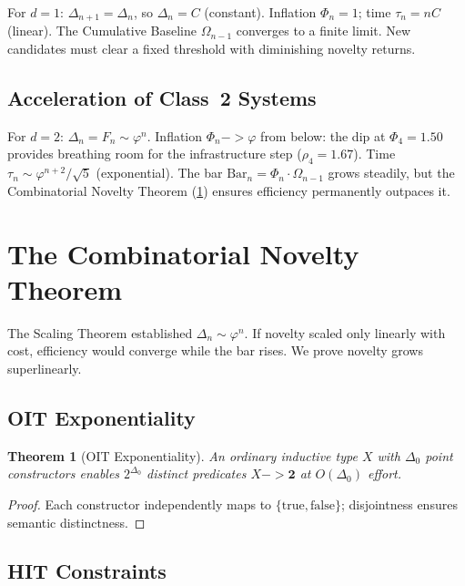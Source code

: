 \documentclass[11pt,a4paper]{article}
\def\to{->}%
\theoremstyle{plain}
\newtheorem{theorem}{Theorem}[section]
\theoremstyle{definition}
\theoremstyle{remark}
\begin{document}
For $d = 1$: $\Delta_{n+1} = \Delta_n$, so $\Delta_n = C$ (constant).
Inflation $\Phi_n = 1$; time $\tau_n = nC$ (linear).
The Cumulative Baseline $\Omega_{n-1}$ converges to a finite limit.
New candidates must clear a fixed threshold with diminishing novelty returns.

\subsection{Acceleration of Class~2 Systems}

For $d = 2$: $\Delta_n = F_n \sim \varphi^n$.
Inflation $\Phi_n \to \varphi$ from below: the dip at $\Phi_4 = 1.50$ provides breathing room for the infrastructure step ($\rho_4 = 1.67$).
Time $\tau_n \sim \varphi^{n+2}/\sqrt{5}$ (exponential).
The bar $\mathrm{Bar}_n = \Phi_n \cdot \Omega_{n-1}$ grows steadily, but the Combinatorial Novelty Theorem (\cref{sec:exponentiality}) ensures efficiency permanently outpaces it.

\section{The Combinatorial Novelty Theorem}
\label{sec:exponentiality}

The Scaling Theorem established $\Delta_n \sim \varphi^n$.
If novelty scaled only linearly with cost, efficiency would converge while the bar rises.
We prove novelty grows superlinearly.

\subsection{OIT Exponentiality}

\begin{theorem}[OIT Exponentiality]
\label{thm:oit-exponentiality}
An ordinary inductive type $X$ with $\Delta_0$ point constructors enables $2^{\Delta_0}$ distinct predicates $X \to \mathbf{2}$ at $O(\Delta_0)$ effort.
\end{theorem}

\begin{proof}
Each constructor independently maps to $\{\mathrm{true}, \mathrm{false}\}$; disjointness ensures semantic distinctness.
\end{proof}

\subsection{HIT Constraints}
\end{document}
